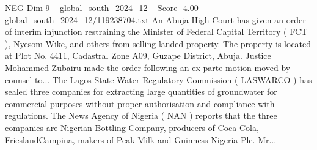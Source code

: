 \begin{textsample}{NEG Dim 9 – global\_south\_2024\_12 – Score -4.00 – global\_south\_2024\_12/119238704.txt}
An Abuja High Court has given an order of interim injunction restraining the Minister of Federal Capital Territory ( FCT ), Nyesom Wike, and others from selling landed property.
The property is located at Plot No. 4411, Cadastral Zone A09, Guzape District, Abuja.
Justice Mohammed Zubairu made the order following an ex-parte motion moved by counsel to...
The Lagos State Water Regulatory Commission ( LASWARCO ) has sealed three companies for extracting large quantities of groundwater for commercial purposes without proper authorisation and compliance with regulations.
The News Agency of Nigeria ( NAN ) reports that the three companies are Nigerian Bottling Company, producers of Coca-Cola, FrieslandCampina, makers of Peak Milk and Guinness Nigeria Plc.
Mr...

\end{textsample}
